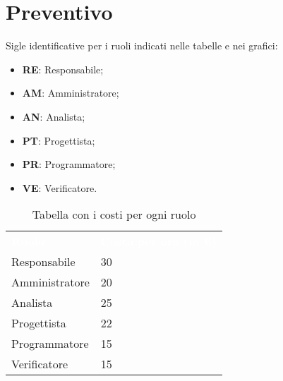 \section{Preventivo}
Sigle identificative per i ruoli indicati nelle tabelle e nei grafici:
\begin{itemize}
    \item \textbf{RE}: Responsabile;
    \item \textbf{AM}: Amministratore;
    \item \textbf{AN}: Analista;
    \item \textbf{PT}: Progettista;
    \item \textbf{PR}: Programmatore;
    \item \textbf{VE}: Verificatore.
\end{itemize}

{	
\renewcommand{\arraystretch}{2}
\centering
\begin{longtable}[h!]{ C{3cm} C{4cm}}
\caption{Tabella con i costi per ogni ruolo}\\

\textcolor{white}{\textbf{Ruolo}} & \textcolor{white}{\textbf{Costo per ora (in \euro{})}}\\

Responsabile   & 30 \\
Amministratore & 20 \\
Analista       & 25 \\
Progettista    & 22 \\
Programmatore  & 15 \\
Verificatore   & 15 \\
\end{longtable}
}

\clearpage

